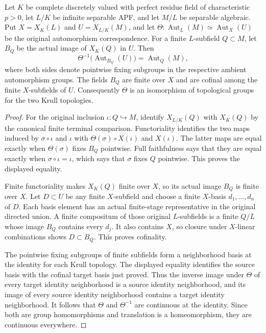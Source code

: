 \begin{lemma}
\label{fw:separable-automorphism-krull}
\leanok
Let $K$ be complete discretely valued with perfect residue field of
characteristic $p>0$, let $L/K$ be infinite separable APF, and let
$M/L$ be separable algebraic. Put $X=X_K(L)$ and $U=X_{L/K}(M)$,
and let $\Theta:\operatorname{Aut}_L(M)\simeq\operatorname{Aut}_X(U)$
be the original automorphism correspondence. For a finite
$L$-subfield $Q\subset M$, let $B_Q$ be the actual image of
$X_K(Q)$ in $U$. Then
\[
 \Theta^{-1}\bigl(\operatorname{Aut}_{B_Q}(U)\bigr)
       =\operatorname{Aut}_Q(M),
\]
where both sides denote pointwise fixing subgroups in the respective
ambient automorphism groups. The fields $B_Q$ are finite over $X$
and are cofinal among the finite $X$-subfields of $U$.
Consequently $\Theta$ is an isomorphism of topological groups for
the two Krull topologies.
\end{lemma}
\begin{proof}
For the original inclusion $\iota:Q\hookrightarrow M$, identify
$X_{L/K}(Q)$ with $X_K(Q)$ by the canonical finite terminal
comparison. Functoriality identifies the two maps induced by
$\sigma\circ\iota$ and $\iota$ with
$\Theta(\sigma)\circ X(\iota)$ and $X(\iota)$.
The latter maps are equal exactly when $\Theta(\sigma)$ fixes
$B_Q$ pointwise. Full faithfulness says that they are equal exactly
when $\sigma\circ\iota=\iota$, which says that $\sigma$ fixes $Q$
pointwise. This proves the displayed equality.

Finite functoriality makes $X_K(Q)$ finite over $X$, so its actual
image $B_Q$ is finite over $X$. Let $D\subset U$ be any finite
$X$-subfield and choose a finite $X$-basis $d_1,\ldots,d_n$ of $D$.
Each basis element has an actual finite-stage representative in the
original directed union. A finite compositum of those original
$L$-subfields is a finite $Q/L$ whose image $B_Q$ contains every
$d_j$. It also contains $X$, so closure under $X$-linear combinations
shows $D\subset B_Q$. This proves cofinality.

The pointwise fixing subgroups of finite subfields form a
neighborhood basis at the identity for each Krull topology.
The displayed equality identifies the source basis with the
cofinal target basis just proved. Thus the inverse image under
$\Theta$ of every target identity neighborhood is a source
identity neighborhood, and its image of every source identity
neighborhood contains a target identity neighborhood.
It follows that $\Theta$ and $\Theta^{-1}$ are continuous at the
identity. Since both are group homomorphisms and translation is a
homeomorphism, they are continuous everywhere.
\end{proof}

